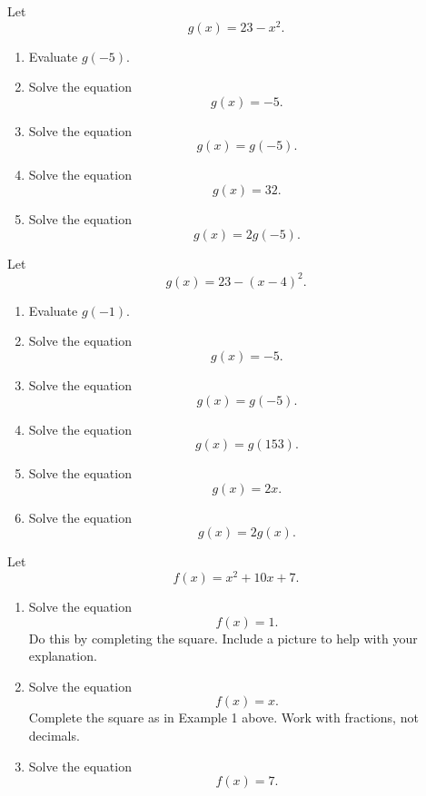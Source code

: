 \documentclass{ximera}
\begin{document}
\begin{exercise} \label{EXMf39201}
Let
\[
    g(x) = 23 - x^2 .
\]

\begin{enumerate}
\item Evaluate $g(-5)$.

\item Solve the equation 
\[
      g(x) = -5 .
\]

\item Solve the equation
\[
   g(x) = g(-5).
\]

\item Solve the equation
\[
   g(x) = 32 .
\]

\item Solve the equation
\[
    g(x) = 2 g(-5).
\]
\end{enumerate}
\end{exercise}


\begin{exercise} \label{EXMf39202}
Let
\[
    g(x) = 23 - (x-4)^2 .
\]

\begin{enumerate}
\item Evaluate $g(-1)$.

\item Solve the equation 
\[
      g(x) = -5 .
\]

\item Solve the equation
\[
   g(x) = g(-5).
\]

\item Solve the equation
\[
  g(x) = g(153) .
\]

\item Solve the equation
\[
   g(x) = 2x .
\]

\item Solve the equation
\[
      g(x)=2g(x) .
\]
\end{enumerate}
\end{exercise}



\begin{exercise} \label{ExMfd83r1fl}
Let 
\[
     f(x) = x^2 + 10x + 7.
\]

\begin{enumerate}
\item Solve the equation
\[
     f(x) = 1.
\]
Do this by completing the square. Include a picture to help with your explanation.

\item Solve the equation
\[
        f(x) = x .
\]
Complete the square as in Example 1 above. Work with fractions, not decimals.

\item Solve the equation
\[
          f(x) = 7.
\]
\end{enumerate}

\end{exercise}
\end{document}
